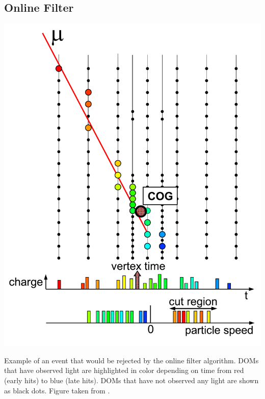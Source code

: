 \subsection{Online Filter}
\begin{marginfigure}
    \includegraphics[width=\textwidth]{figures/icecube/eventviews/FilterDiagram.pdf}
    \caption{Example of an event that would be rejected by the online filter algorithm. DOMs that have observed light are highlighted in color depending on time from red (early hits) to blue (late hits). DOMs that have not observed any light are shown as black dots. Figure taken from \cite{DeepCore}.}
    \label{fig:online-filter-event}
\end{marginfigure}

